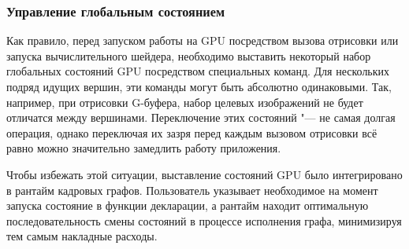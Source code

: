 \subsubsection{Управление глобальным состоянием}
Как правило, перед запуском работы на GPU посредством вызова отрисовки или запуска вычислительного шейдера, необходимо выставить некоторый набор глобальных состояний GPU посредством специальных команд.
Для нескольких подряд идущих вершин, эти команды могут быть абсолютно одинаковыми.
Так, например, при отрисовки G-буфера, набор целевых изображений не будет отличатся между вершинами.
Переключение этих состояний "--- не самая долгая операция, однако переключая их зазря перед каждым вызовом отрисовки всё равно можно значительно замедлить работу приложения.

Чтобы избежать этой ситуации, выставление состояний GPU было интегрировано в рантайм кадровых графов.
Пользователь указывает необходимое на момент запуска состояние в функции декларации, а рантайм находит оптимальную последовательность смены состояний в процессе исполнения графа, минимизируя тем самым накладные расходы.

